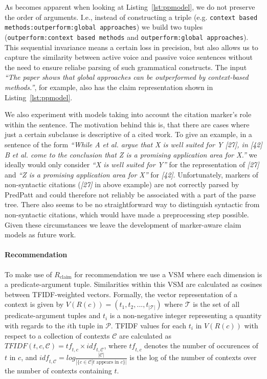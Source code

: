 As becomes apparent when looking at Listing~\ref{lst:ppmodel}, we do not preserve the order of arguments. I.e., instead of constructing a triple (e.g. \texttt{context based methods:outperform:global approaches}) we build two tuples (\texttt{outperform:context based methods} and \texttt{outper\-form:global approaches}). This sequential invariance means a certain loss in precision, but also allows us to capture the similarity between active voice and passive voice sentences without the need to ensure reliabe parsing of such grammatical constructs. The input \emph{``The paper shows that global approaches can be outperformed by context-based methods.''}, for example, also has the claim representation shown in Listing~\ref{lst:ppmodel}.

We also experiment with models taking into account the citation marker's role within the sentence. The motivation behind this is, that there are cases where just a certain subclause is descriptive of a cited work. To give an example, in a sentence of the form \emph{``While A et al. argue that X is well suited for Y [27], in [42] B et al. come to the conclusion that Z is a promising application area for X.''} we ideally would only consider \emph{``X is well suited for Y''} for the representation of \emph{[27]} and \emph{``Z is a promising application area for X''} for \emph{[42]}. Unfortunately, markers of non-syntactic citations (\emph{[27]} in above example) are not correctly parsed by PredPatt and could therefore not reliably be associated with a part of the parse tree. There also seems to be no straightforward way to distinguish syntactic from non-syntactic citations, which would have made a preprocessing step possible. Given these circumstances we leave the development of marker-aware claim models as future work.

\paragraph{Recommendation} To make use of $R_{\text{claim}}$ for recommendation we use a VSM where each dimension is a predicate-argument tuple. Similarities within this VSM are calculated as cosines between TFIDF-weighted vectors. Formally, the vector representation of a context is given by $V(R(c)) = (t_{1}, t_{2}, ..., t_{|\mathcal{T}|})$ where $\mathcal{T}$ is the set of all predicate-argument tuples %
and $t_{i}$ is a non-negative integer representing a quantity with regards to the $i$th tuple in $\mathcal{P}$. TFIDF values for each $t_{i}$ in $V(R(c))$ with respect to a collection of contexts $\mathcal{C}$ are calculated as $\mathit{TFIDF}(t, c, \mathcal{C}) = \mathit{tf}_{t,c} \times \mathit{idf}_{t,\mathcal{C}}$, where $\mathit{tf}_{t,c}$ denotes the number of occurences of $t$ in $c$, and $\mathit{idf}_{t,\mathcal{C}} = \mathit{log}\frac{|\mathcal{C}|}{|\{c\in\mathcal{C}|t\text{ appears in }c\}|}$ is the log of the number of contexts over the number of contexts containing $t$.

